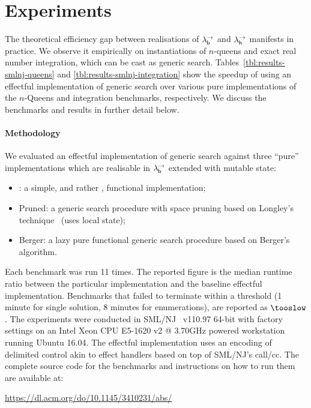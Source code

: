 \documentclass[12pt,phd,lfcs,twoside,openright,logo,leftchapter,normalheadings]{infthesis}
\theoremstyle{plain}
\theoremstyle{definition}
\begin{document}
\tableone
\tablesmlnjintegration
\tabletwo
\tablemltonintegration
\tablethree
\tablemltonvssmlnjintegration

\section{Experiments}
\label{sec:experiments}
The theoretical efficiency gap between realisations of $\lambda^\rightarrow_{\mathsf{b}}$ and
$\lambda^\rightarrow_{\mathsf{h}}$ manifests in practice. We observe it empirically on
instantiations of $n$-queens and exact real number integration, which
can be cast as generic search. Tables~\ref{tbl:results-smlnj-queens}
and \ref{tbl:results-smlnj-integration} show the speedup of using an
effectful implementation of generic search over various pure
implementations of the $n$-Queens and integration benchmarks,
respectively. We discuss the benchmarks and results in further detail
below.


\paragraph{Methodology}
We evaluated an effectful implementation of generic search against
three ``pure'' implementations which are realisable in $\lambda^\rightarrow_{\mathsf{b}}$
extended with mutable state:
%
\begin{itemize}
\item \Naive: a simple, and rather \naive, functional implementation;
\item Pruned: a generic search procedure with space pruning based on
  Longley's technique~\cite{Longley99} (uses local state);
\item Berger: a lazy pure functional generic search procedure based on
  Berger's algorithm.
\end{itemize}
%
Each benchmark was run 11 times. The reported figure is the median
runtime ratio between the particular implementation and the baseline
effectful implementation. Benchmarks that failed to terminate within a
threshold (1 minute for single solution, 8 minutes for enumerations),
are reported as $\tooslow$. The experiments were conducted in
SML/NJ~\cite{AppelM91} v110.97 64-bit with factory settings on an Intel Xeon
CPU E5-1620 v2 @ 3.70GHz powered workstation running Ubuntu 16.04. The
effectful implementation uses an encoding of delimited control akin to
effect handlers based on top of SML/NJ's call/cc.
%
The complete source code for the benchmarks and instructions on how to
run them are available at:
\begin{center}
  \url{https://dl.acm.org/do/10.1145/3410231/abs/}
\end{center}
%
\end{document}
